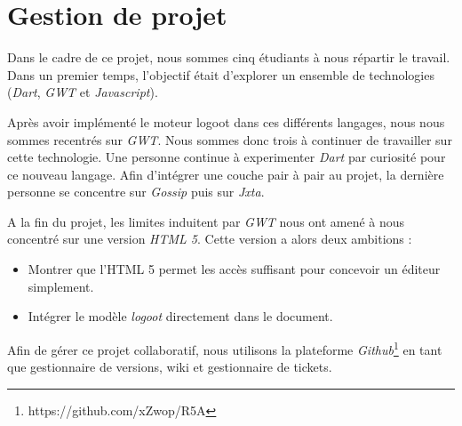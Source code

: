 \chapter{Gestion de projet}
  Dans le cadre de ce projet, nous sommes cinq étudiants à nous répartir le 
  travail. Dans un premier temps, l'objectif était d'explorer un ensemble de 
  technologies (\emph{Dart}, \emph{GWT} et \emph{Javascript}).
  
  Après avoir implémenté le moteur logoot dans ces différents langages, nous
  nous sommes recentrés sur \emph{GWT}. Nous sommes donc trois à continuer de 
  travailler sur cette technologie. Une personne continue à experimenter 
  \emph{Dart} par curiosité pour ce nouveau langage. Afin d'intégrer une couche
  pair à pair au projet, la dernière personne se concentre sur \emph{Gossip} puis
  sur \emph{Jxta}.
  
  A la fin du projet, les limites induitent par \emph{GWT} nous ont amené à nous
  concentré sur une version \emph{HTML 5}. Cette version a alors deux ambitions :
  \begin{itemize}
	\item Montrer que l'HTML 5 permet les accès suffisant pour concevoir un 
	éditeur simplement.
	\item Intégrer le modèle \emph{logoot} directement dans le document.
  \end{itemize}
  
  Afin de gérer ce projet collaboratif, nous utilisons la plateforme 
  \emph{Github}\footnote{https://github.com/xZwop/R5A} en tant que 
  gestionnaire de versions, wiki et gestionnaire de tickets.
